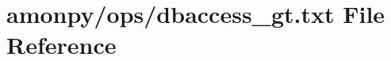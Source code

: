 \hypertarget{dbaccess__gt_8txt}{\section{amonpy/ops/dbaccess\-\_\-gt.txt File Reference}
\label{dbaccess__gt_8txt}
}
